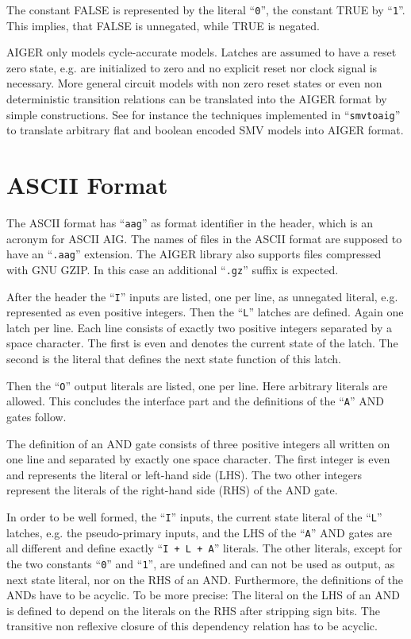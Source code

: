 \documentclass[10pt]{llncs}
\begin{document}
  The constant FALSE is represented by the literal ``\texttt{0}'', the constant TRUE by
  ``\texttt{1}''.  This implies, that FALSE is unnegated, while TRUE is negated.

  AIGER only models cycle-accurate models.  Latches are assumed to have a
  reset zero state, e.g. are initialized to zero and no explicit reset nor
  clock signal is necessary.  More general circuit models with non zero
  reset states or even non deterministic transition relations can be
  translated into the AIGER format by simple constructions.  See for
  instance the techniques implemented in ``\texttt{smvtoaig}'' to translate 
  arbitrary flat and boolean encoded SMV models into AIGER format.

\section{ASCII Format}
  
  The ASCII format has ``\texttt{aag}'' as format identifier in the header, which is an
  acronym for ASCII AIG.  The names of files in the ASCII format are
  supposed to have an ``\texttt{.aag}''  extension.  The AIGER library also supports
  files compressed with GNU GZIP.  In this case an additional ``\texttt{.gz}'' suffix
  is expected.

  After the header the ``\texttt{I}'' inputs are listed, one per line, as unnegated
  literal, e.g.  represented as even positive integers.  Then the ``\texttt{L}''
  latches are defined.  Again one latch per line.  Each line consists of
  exactly two positive integers separated by a space character.  The first
  is even and denotes the current state of the latch. The second is the
  literal that defines the next state function of this latch.  
  
  Then the ``\texttt{O}'' output literals are listed, one per line.  Here arbitrary
  literals are allowed.  This concludes the interface part and the
  definitions of the ``\texttt{A}'' AND gates follow.

  The definition of an AND gate consists of three positive integers all
  written on one line and separated by exactly one space character.  The
  first integer is even and represents the literal or left-hand side (LHS).
  The two other integers represent the literals of the right-hand side
  (RHS) of the AND gate.

  In order to be well formed, the ``\texttt{I}'' inputs, the current state literal of
  the ``\texttt{L}'' latches, e.g. the pseudo-primary inputs, and the LHS of the
  ``\texttt{A}''
  AND gates are all different and define exactly ``\texttt{I + L + A}'' literals.  The
  other literals, except for the two constants ``\texttt{0}'' and ``\texttt{1}'', are undefined
  and can not be used as output, as next state literal, nor on the RHS of an
  AND.  Furthermore, the definitions of the ANDs have to be acyclic.  To be
  more precise: The literal on the LHS of an AND is defined to depend on the
  literals on the RHS after stripping sign bits.  The transitive non
  reflexive closure of this dependency relation has to be acyclic.
\end{document}
